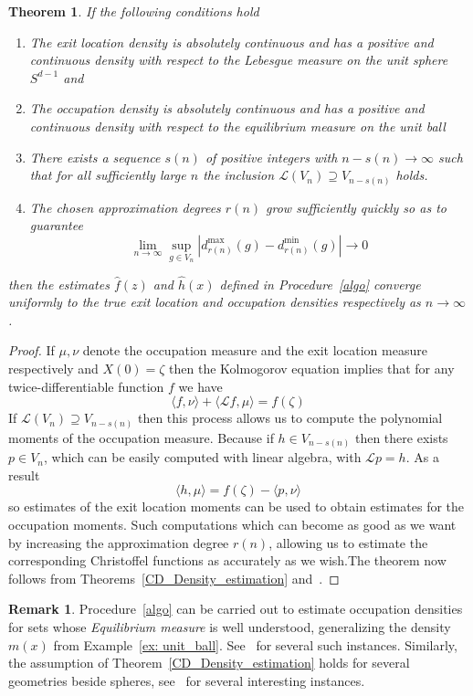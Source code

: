 \documentclass[12pt]{amsart}
\newtheorem{theorem}[lemma]{Theorem}
\theoremstyle{definition}
\newtheorem{remark}[lemma]{Remark}
\begin{document}
\begin{theorem}\label{Thm: CD-densities-estimation} If the following conditions hold
\begin{enumerate}
\item The exit location density is absolutely continuous and has a positive and continuous density with respect to the Lebesgue measure on the unit sphere $S^{d-1}$ and
\item The occupation density is absolutely continuous and has a positive and continuous density with respect to the equilibrium measure on the unit ball
\item There exists a sequence $s(n)$ of positive integers with $n-s(n)\rightarrow \infty$ such that for all sufficiently large $n$ the inclusion $\mathcal{L}(V_n)\supseteq V_{n-s(n)}$ holds.
\item The chosen approximation degrees $r(n)$ grow sufficiently quickly so as to guarantee 
\[\lim_{n\rightarrow \infty}\sup_{g\in V_n}|d_{r(n)}^{\max}(g)-d_{r(n)}^{\min}(g)|\rightarrow 0\]  
\end{enumerate}
then the estimates $\widehat{f}(z)$ and $\widehat{h}(x)$ defined in Procedure~\ref{algo} converge uniformly to the true exit location and occupation densities respectively as $n\rightarrow \infty$.
\end{theorem}
\begin{proof} If $\mu,\nu$ denote the occupation measure and the exit location measure respectively and $X(0)=\zeta$ then the Kolmogorov equation implies that for any twice-differentiable function $f$ we have 
\[\langle f,\nu\rangle + \langle \mathcal{L}f,\mu\rangle = f(\zeta)\]
If $\mathcal{L}(V_n)\supseteq V_{n-s(n)}$ then this process allows us to compute the polynomial moments of the occupation measure. Because if $h\in V_{n-s(n)}$ then there exists $p\in V_n$, which can be easily computed with linear algebra, with $\mathcal{L}p=h$. As a result 
\[\langle h,\mu\rangle = f(\zeta)-\langle p,\nu\rangle\]
so estimates of the exit location moments can be used to obtain estimates for the occupation moments. Such computations which can become as good as we want by increasing the approximation degree $r(n)$, allowing us to estimate the corresponding Christoffel functions as accurately as we wish.The theorem now follows from Theorems~\ref{CD_Density_estimation} and~\cite[Theorem 1.3]{KrooLubitsky2013a}.
\end{proof}

\begin{remark}\label{Rmk: Extensions} Procedure~\ref{algo} can be carried out to estimate occupation densities for sets whose {\it Equilibrium measure} is well understood, generalizing the density $m(x)$ from Example~\ref{ex: unit_ball}. See~\cite[Section 4.2]{LPPBook} for several such instances. Similarly, the assumption of Theorem~\ref{CD_Density_estimation} holds for several geometries beside spheres, see~\cite[pag.71]{LPPBook} for several interesting instances.
\end{remark}
\end{document}
